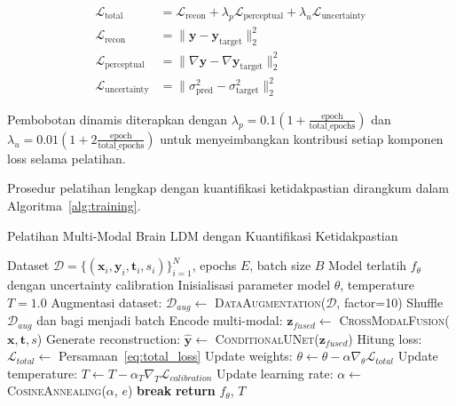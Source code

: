 \begin{align}
\mathcal{L}_{\text{total}} &= \mathcal{L}_{\text{recon}} + \lambda_p \mathcal{L}_{\text{perceptual}} + \lambda_u \mathcal{L}_{\text{uncertainty}} \label{eq:total_loss} \\
\mathcal{L}_{\text{recon}} &= \|\mathbf{y} - \mathbf{y}_{\text{target}}\|_2^2 \label{eq:recon_loss} \\
\mathcal{L}_{\text{perceptual}} &= \|\nabla \mathbf{y} - \nabla \mathbf{y}_{\text{target}}\|_2^2 \label{eq:perceptual_loss} \\
\mathcal{L}_{\text{uncertainty}} &= \|\sigma_{\text{pred}}^2 - \sigma_{\text{target}}^2\|_2^2 \label{eq:uncertainty_loss}
\end{align}

Pembobotan dinamis diterapkan dengan $\lambda_p = 0.1(1 + \frac{\text{epoch}}{\text{total\_epochs}})$ dan $\lambda_u = 0.01(1 + 2\frac{\text{epoch}}{\text{total\_epochs}})$ untuk menyeimbangkan kontribusi setiap komponen loss selama pelatihan.

Prosedur pelatihan lengkap dengan kuantifikasi ketidakpastian dirangkum dalam Algoritma~\ref{alg:training}.

\begin{algorithm}[htbp]
\caption{Pelatihan Multi-Modal Brain LDM dengan Kuantifikasi Ketidakpastian}
\label{alg:training}
\begin{algorithmic}[1]
\Require Dataset $\mathcal{D} = \{(\mathbf{x}_i, \mathbf{y}_i, \mathbf{t}_i, s_i)\}_{i=1}^N$, epochs $E$, batch size $B$
\Ensure Model terlatih $f_\theta$ dengan uncertainty calibration
\State Inisialisasi parameter model $\theta$, temperature $T = 1.0$
\State Augmentasi dataset: $\mathcal{D}_{aug} \leftarrow$ \textsc{DataAugmentation}($\mathcal{D}$, factor=10)
    \State Shuffle $\mathcal{D}_{aug}$ dan bagi menjadi batch
        \State Encode multi-modal: $\mathbf{z}_{fused} \leftarrow$ \textsc{CrossModalFusion}($\mathbf{x}, \mathbf{t}, s$)
        \State Generate reconstruction: $\hat{\mathbf{y}} \leftarrow$ \textsc{ConditionalUNet}($\mathbf{z}_{fused}$)
        \State Hitung loss: $\mathcal{L}_{total} \leftarrow$ Persamaan~\ref{eq:total_loss}
        \State Update weights: $\theta \leftarrow \theta - \alpha \nabla_\theta \mathcal{L}_{total}$
        \State Update temperature: $T \leftarrow T - \alpha_T \nabla_T \mathcal{L}_{calibration}$
    \EndFor
    \State Update learning rate: $\alpha \leftarrow$ \textsc{CosineAnnealing}($\alpha$, $e$)
        \State \textbf{break} 
    \EndIf
\EndFor
\State \textbf{return} $f_\theta$, $T$
\end{algorithmic}
\end{algorithm}

